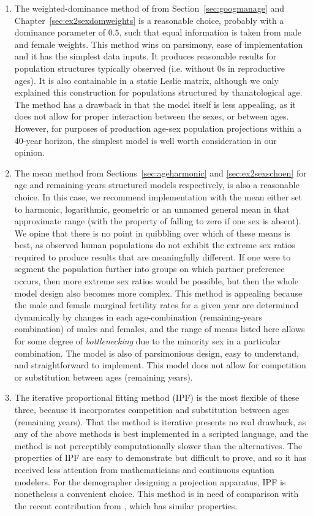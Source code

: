 \begin{enumerate}
\item The weighted-dominance method of \citet{goodman1967age} from
Section~\ref{sec:googmanage} and Chapter~\ref{sec:ex2sexdomweights} is a
reasonable choice, probably with a dominance parameter of $0.5$, 
such that equal information is taken from male and female
weights. This method wins on parsimony, ease of implementation and it has the
simplest data inputs. It produces reasonable results for population
structures typically observed (i.e. without 0s in reproductive ages). It is also 
containable in a static Leslie matrix, although
we only explained this construction for populations structured by
thanatological age. The method has a drawback in that the model itself is less
appealing, as it does not allow for proper interaction between the sexes, or
between ages. However, for purposes of production age-sex population projections
within a 40-year horizon, the simplest model is well worth consideration in our opinion.

\item The mean method from Sections~\ref{sec:ageharmonic} and
\ref{sec:ex2sexschoen} for age and remaining-years structured models
respectively, is also a reasonable choice. In this case, we recommend
implementation with the mean either set to harmonic, logarithmic, geometric or
an unnamed general mean in that approximate range (with the property of 
falling to zero if one sex is absent). We opine that there is no point in
quibbling over which of these means is best, as observed human populations do
not exhibit the extreme sex ratios required to produce results that are
meaningfully different. If one were to segment the population further into
groups on which partner preference occurs, then more extreme sex ratios would
be possible, but then the whole model design also becomes more complex. This
method is appealing because the male and female marginal fertility rates 
for a given year are determined dynamically by changes in each 
age-combination (remaining-years combination) of males and females, and the
range of means listed here allows for some degree of \textit{bottlenecking} due
to the minority sex in a particular combination. The model is also of
parsimonious design, easy to understand, and straightforward to implement. This
model does not allow for competition or substitution between ages (remaining
years).

\item The iterative proportional fitting method (IPF) is the most flexible of
these three, because it incorporates competition and substitution between ages (remaining
years). That the
method is iterative presents no real drawback, as any of the above methods is best 
implemented in a scripted language, and the method is
not perceptibly computationally slower than the alternatives. The properties of
IPF are easy to demonstrate but difficult to prove, and so it has received less attention from
mathematicians and continuous equation modelers. For the demographer designing
a projection apparatus, IPF is nonetheless a convenient choice. This method is in need of
comparison with the recent contribution from \citet{choo2006estimating}, which
has similar properties.
\end{enumerate}

